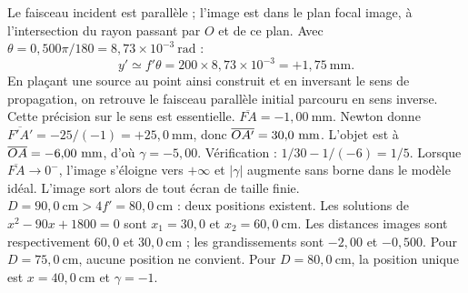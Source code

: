 Le faisceau incident est parallèle ; l'image est dans le plan focal image, à l'intersection du rayon passant par $O$ et de ce plan. Avec $\theta=0{,}500\pi/180=8{,}73\times10^{-3}\ \mathrm{rad}$ :
\[y'\simeq f'\theta=200\times8{,}73\times10^{-3}=+1{,}75\ \mathrm{mm}.\]
En plaçant une source au point ainsi construit et en inversant le sens de propagation, on retrouve le faisceau parallèle initial parcouru en sens inverse. Cette précision sur le sens est essentielle.
$\overline{FA}=-1{,}00\ \mathrm{mm}$. Newton donne $\overline{F'A'}=-25/(-1)=+25{,}0\ \mathrm{mm}$, donc $\overline{OA'}=30{,}0\ \mathrm{mm}$. L'objet est à $\oa=-6{,}00\ \mathrm{mm}$, d'où $\gamma=-5{,}00$. Vérification : $1/30-1/(-6)=1/5$.
Lorsque $\overline{FA}\to0^-$, l'image s'éloigne vers $+\infty$ et $|\gamma|$ augmente sans borne dans le modèle idéal. L'image sort alors de tout écran de taille finie.
$D=90{,}0\ \mathrm{cm}>4f'=80{,}0\ \mathrm{cm}$ : deux positions existent. Les solutions de $x^2-90x+1800=0$ sont $x_1=30{,}0$ et $x_2=60{,}0\ \mathrm{cm}$. Les distances images sont respectivement $60{,}0$ et $30{,}0\ \mathrm{cm}$ ; les grandissements sont $-2{,}00$ et $-0{,}500$.
Pour $D=75{,}0\ \mathrm{cm}$, aucune position ne convient. Pour $D=80{,}0\ \mathrm{cm}$, la position unique est $x=40{,}0\ \mathrm{cm}$ et $\gamma=-1$.

